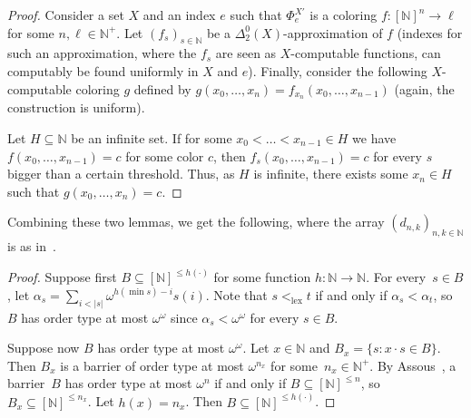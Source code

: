 \documentclass[10pt,a4paper]{article}
\newcommand{\NN}[0]{\mathbb{N}}
\newcommand{\lex}{\mathrm{lex}}
\numberwithin{theorem}{section}
\newtheorem{lemma}[theorem]{Lemma}
\begin{document}
\begin{proof}
Consider a set $X$ and an index $e$ such that $\Phi_e^{X'}$ is a coloring $f : [\NN]^n \to \ell$ for some $n, \ell \in \NN^+$. Let $(f_s)_{s\in \NN}$ be a $\Delta_2^0(X)$-approximation of $f$ (indexes for such an approximation, where the $f_s$ are seen as $X$-computable functions, can computably be found uniformly in $X$ and $e$). Finally, consider the following $X$-computable coloring $g$ defined by $g(x_0, \dots, x_{n}) = f_{x_n}(x_0, \dots, x_{n-1})$ (again, the construction is uniform).

Let $H \subseteq \NN$ be an infinite set. If for some $x_0 < \dots < x_{n-1} \in H$ we have $f(x_0, \dots, x_{n-1}) = c$ for some color $c$, then $f_s(x_0, \dots, x_{n-1}) = c$ for every $s$ bigger than a certain threshold. Thus, as $H$ is infinite, there exists some $x_n \in H$ such that $g(x_0, \dots, x_n) = c$.  
\end{proof}

Combining these two lemmas, we get the following, where the array $(d_{n,k})_{n,k\in\NN}$ is as in~.


\begin{proof}
Suppose first $B \subseteq [\NN]^{\leq h(\cdot)}$ for some function $h : \NN \to \NN$.
For every~$s \in B$, let $\alpha_s = \sum_{i < |s|} \omega^{h(\min s)-i} s(i)$. %
Note that $s <_{\lex} t$ if and only if $\alpha_s < \alpha_t$, so $B$ has order type at most $\omega^\omega$ since $\alpha_s < \omega^{\omega}$ for every $s \in B$.

Suppose now $B$ has order type at most $\omega^{\omega}$. Let $x \in \NN$ and $B_x = \{ s : x \cdot s \in B \}$. Then $B_x$ is a barrier of order type at most $\omega^{n_x}$ for some~$n_x \in \NN^+$. By Assous~\cite[Proposition II.1]{assous1974caracterisation}, a barrier~$B$ has order type at most $\omega^n$ if and only if $B \subseteq [\NN]^{\leq n}$, so $B_x \subseteq [\NN]^{\leq n_x}$. Let $h(x) = n_x$. Then $B \subseteq [\NN]^{\leq h(\cdot)}$.
\end{proof}
\end{document}
